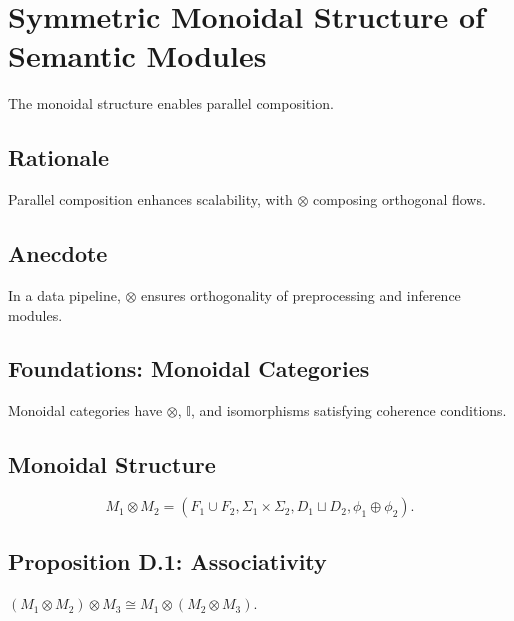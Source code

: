 \documentclass[12pt]{article}
\begin{document}
\begin{center}
\end{center}

\section{Symmetric Monoidal Structure of Semantic Modules}
\label{sec:chapter8}

The monoidal structure enables parallel composition.

\subsection{Rationale}
Parallel composition enhances scalability, with $\otimes$ composing orthogonal flows.

\subsection{Anecdote}
In a data pipeline, $\otimes$ ensures orthogonality of preprocessing and inference modules.

\subsection{Foundations: Monoidal Categories}
Monoidal categories \cite{mac2013categories} have $\otimes$, $\mathbb{I}$, and isomorphisms satisfying coherence conditions.

\subsection{Monoidal Structure}
\[
M_1 \otimes M_2 = (F_1 \cup F_2, \Sigma_1 \times \Sigma_2, D_1 \sqcup D_2, \phi_1 \oplus \phi_2).
\]

\subsection{Proposition D.1: Associativity}
$(M_1 \otimes M_2) \otimes M_3 \cong M_1 \otimes (M_2 \otimes M_3)$.
\end{document}
